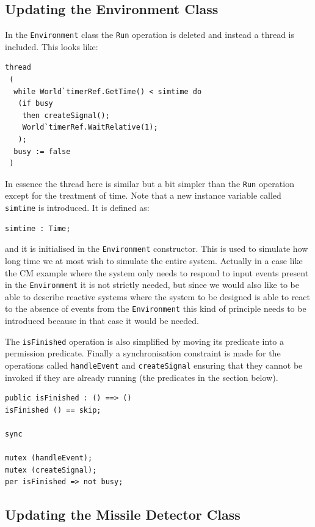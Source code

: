 \documentclass{overturerepchap}
\begin{document}
\subsection{Updating the Environment Class}

In the \texttt{Environment} class the \texttt{Run} operation is
deleted and instead a thread is included. This looks like:

\begin{lstlisting}
thread
 (
  while World`timerRef.GetTime() < simtime do
   (if busy
    then createSignal();
    World`timerRef.WaitRelative(1);
   );
  busy := false
 )
\end{lstlisting}

In essence the thread here is similar but a bit simpler than the
\texttt{Run} operation except for the treatment of time. Note that a
new instance variable called \texttt{simtime} is introduced. It is
defined as:

\begin{lstlisting}
simtime : Time;
\end{lstlisting}
and it is initialised in the \texttt{Environment} constructor. This
is used to simulate how long time we at most wish to simulate the
entire system. Actually in a case like the CM example where the system
only needs to respond to input events present in the
\texttt{Environment} it is not strictly needed, but since we would
also like to be able to describe reactive systems where the system to
be designed is able to react to the absence of events from the
\texttt{Environment} this kind of principle needs to be introduced
because in that case it would be needed.

The \texttt{isFinished} operation is also simplified by moving its
predicate into a permission predicate. Finally a synchronisation
constraint is made for the operations called
\texttt{handleEvent} and \texttt{createSignal}
ensuring that they cannot be invoked if they
are already running (the {\bf{}} predicates in the
{\bf{}} 
section below).

\begin{lstlisting}
public isFinished : () ==> ()
isFinished () == skip;

sync

mutex (handleEvent);
mutex (createSignal);
per isFinished => not busy;
\end{lstlisting}

\subsection{Updating the Missile Detector Class}
\end{document}
